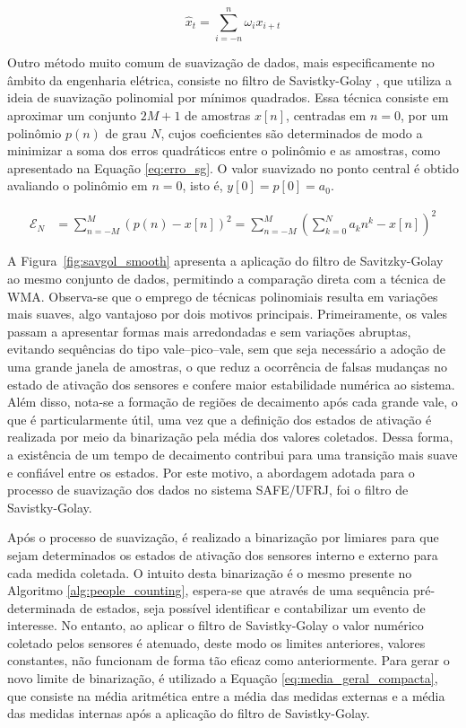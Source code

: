 \begin{equation}
\hat{x}_t = \sum_{i=-n}^{n} \omega_i x_{i+t}
\label{eq:wma}
\end{equation}

Outro método muito comum de suavização de dados, mais especificamente no âmbito da engenharia elétrica, consiste no filtro de Savistky-Golay \cite{schafer_what_2011}, que utiliza a ideia de suavização polinomial por mínimos quadrados. Essa técnica consiste em aproximar um conjunto $2M + 1$ de amostras $x[n]$, centradas em $n=0$, por um polinômio $p(n)$ de grau $N$, cujos coeficientes são determinados de modo a minimizar a soma dos erros quadráticos entre o polinômio e as amostras, como apresentado na Equação \ref{eq:erro_sg}. O valor suavizado no ponto central é obtido avaliando o polinômio em $n = 0$, isto é, $y[0]=p[0]=a_0$.

\begin{equation}
\begin{aligned}
\mathcal{E}_N 
&= \sum_{n=-M}^{M} \left( p(n) - x[n] \right)^2 = \sum_{n=-M}^{M} \left( \sum_{k=0}^{N} a_k n^k - x[n] \right)^2
\end{aligned}
\label{eq:erro_sg}
\end{equation}


A Figura~\ref{fig:savgol_smooth} apresenta a aplicação do filtro de Savitzky-Golay ao mesmo conjunto de dados, permitindo a comparação direta com a técnica de WMA. Observa-se que o emprego de técnicas polinomiais resulta em variações mais suaves, algo vantajoso por dois motivos principais. Primeiramente, os vales passam a apresentar formas mais arredondadas e sem variações abruptas, evitando sequências do tipo vale–pico–vale, sem que seja necessário a adoção de uma grande janela de amostras, o que reduz a ocorrência de falsas mudanças no estado de ativação dos sensores e confere maior estabilidade numérica ao sistema. Além disso, nota-se a formação de regiões de decaimento após cada grande vale, o que é particularmente útil, uma vez que a definição dos estados de ativação é realizada por meio da binarização pela média dos valores coletados. Dessa forma, a existência de um tempo de decaimento contribui para uma transição mais suave e confiável entre os estados. Por este motivo, a abordagem adotada para o processo de suavização dos dados no sistema SAFE/UFRJ, foi o filtro de Savistky-Golay.

Após o processo de suavização, é realizado a binarização por limiares para que sejam determinados os estados de ativação dos sensores interno e externo para cada medida coletada. O intuito desta binarização é o mesmo presente no Algoritmo \ref{alg:people_counting}, espera-se que através de uma sequência pré-determinada de estados, seja possível identificar e contabilizar um evento de interesse. No entanto, ao aplicar o filtro de Savistky-Golay o valor numérico coletado pelos sensores é atenuado, deste modo os limites anteriores, valores constantes, não funcionam de forma tão eficaz como anteriormente. Para gerar o novo limite de binarização, é utilizado a Equação \ref{eq:media_geral_compacta}, que consiste na média aritmética entre a média das medidas externas e a média das medidas internas após a aplicação do filtro de Savistky-Golay. 

